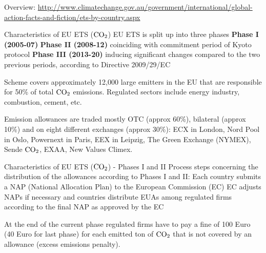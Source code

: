 	Overview: \url{http://www.climatechange.gov.au/government/international/global-action-facts-and-fiction/ets-by-country.aspx}
   

Characteristics of EU ETS ($\textnormal{CO}_2$)
	EU ETS is split up into three phases
		\textbf{Phase I (2005-07)}
		\textbf{Phase II (2008-12)} coinciding with commitment period of Kyoto protocol
		\textbf{Phase III (2013-20)} inducing significant changes compared to the two previous periods, according to Directive 2009/29/EC
  
  Scheme covers approximately 12,000 large emitters in the EU that are responsible for 50\% of total $\textnormal{CO}_2$ emissions. 
	Regulated sectors include energy industry, combustion, cement, etc.
  
	Emission allowances are traded mostly OTC (approx 60\%), bilateral (approx 10\%) and on eight different exchanges (approx 30\%):
  ECX in London, Nord Pool in Oslo, Powernext in Paris, EEX in Leipzig, The Green Exchange (NYMEX), Sende $\textnormal{CO}_2$, EXAA, New Values Climex.
  
  


Characteristics of EU ETS ($\textnormal{CO}_2$) - Phases I and II
	Process steps concerning the distribution of the allowances according to Phases I and II:
		Each country submits a NAP (National Allocation Plan) to the European Commission (EC)
		EC adjusts NAPs if necessary and countries distribute EUAs among regulated firms according to the final NAP as approved by the EC
  
  
	At the end of the current phase regulated firms have to pay a fine of 100 Euro (40 Euro for last phase) for each emitted ton 
	of $\textnormal{CO}_2$ that is not covered by an allowance (excess emissions penalty).
  

